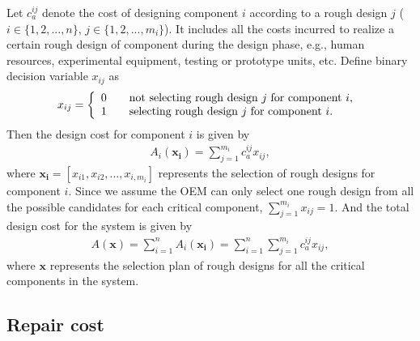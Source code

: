 \documentclass[preprint,12pt]{elsarticle}
\begin{document}
	Let $c^{ij}_{a}$ denote the cost of designing component $i$ according to a rough design $j$ ($i \in \{1,2,...,n\}$, $j \in \{1,2,...,m_i\}$). It includes all the costs incurred to realize a certain rough design of component during the design phase, e.g., human resources, experimental equipment, testing or prototype units, etc. Define binary decision variable $x_{ij}$ as
	\[ x_{ij} = \left \{
	  \begin{array} {l l}
		0 & \quad \text {not selecting rough design $j$ for component $i$, } \\
		1 & \quad \text {selecting rough design $j$ for component $i$. }
		\end {array} \right.\]
		Then the design cost for component $i$ is given by
	 \begin{eqnarray}
	A_{i}(\boldsymbol{x_{i}})=\sum^{m_{i}}_{j=1} {c^{ij}_{a} x_{ij}},
		 \end{eqnarray}
		 where $\boldsymbol{x_{i}}=[x_{i1},x_{i2},...,x_{i,m_i}]$ represents the selection of rough designs for component $i$. Since we assume the OEM can only select one rough design from all the possible candidates for each critical component, $\sum^{m_{i}}_{j=1}{x_{ij}=1}$.
And the total design cost for the system is given by
\begin{eqnarray}
	A(\boldsymbol{x})=\sum ^{n}_{i=1}A_{i}(\boldsymbol{x_{i}})=\sum ^{n}_{i=1}\sum^{m_{i}}_{j=1} {c^{ij}_{a} x_{ij}},
\end{eqnarray}
where $\boldsymbol{x}$ represents the selection plan of rough designs for all the critical components in the system.
	
\subsection{Repair cost}
	
\end{document}
